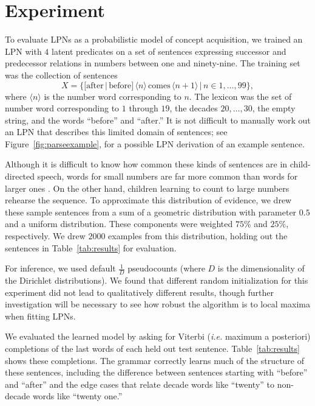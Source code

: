 \documentclass{article} %
\begin{document}
\section{Experiment}

To evaluate LPNs as a probabilistic model of concept acquisition, we
trained an LPN with $4$ latent predicates on a set of sentences
expressing successor and predecessor relations in numbers between one
and ninety-nine. The training set was the collection of sentences $$X
= \{[\text{after}\, | \, \text{before}] \, \langle n \rangle \,
\text{comes} \, \langle n+1 \rangle \,|\, n \in 1,\dots,99\},$$ where
$\langle n \rangle$ is the number word corresponding to $n$. The
lexicon was the set of number word corresponding to $1$ through $19$,
the decades $20, \dots, 30$, the empty string, and the words
``before'' and ``after.'' It is not difficult to manually work out an
LPN that describes this limited domain of sentences; see
Figure~\ref{fig:parseexample}, for a possible LPN derivation of an
example sentence.

Although it is difficult to know how common these kinds of sentences
are in child-directed speech, words for small numbers are far more
common than words for larger ones \cite{macwhinney2000childes}. On the
other hand, children learning to count to large numbers rehearse the
sequence. To approximate this distribution of evidence, we drew these
sample sentences from a sum of a geometric distribution with parameter
$0.5$ and a uniform distribution. These components were weighted
$75\%$ and $25\%$, respectively. We drew $2000$ examples from this
distribution, holding out the sentences in Table~\ref{tab:results} for
evaluation.

For inference, we used default $\frac{1}{D}$ pseudocounts (where $D$ is the
dimensionality of the Dirichlet distributions). We found that different random
initialization for this experiment did not lead to qualitatively different
results, though further investigation will be necessary to see how
robust the algorithm is to local maxima when fitting LPNs.

We evaluated the learned model by asking for Viterbi ({\it i.e.} maximum a
posteriori) completions of the last words of each held out test
sentence. Table~\ref{tab:results} shows these completions. The grammar
correctly learns much of the structure of these sentences, including
the difference between sentences starting with ``before'' and
``after'' and the edge cases that relate decade words like ``twenty''
to non-decade words like ``twenty one.''
\end{document}
